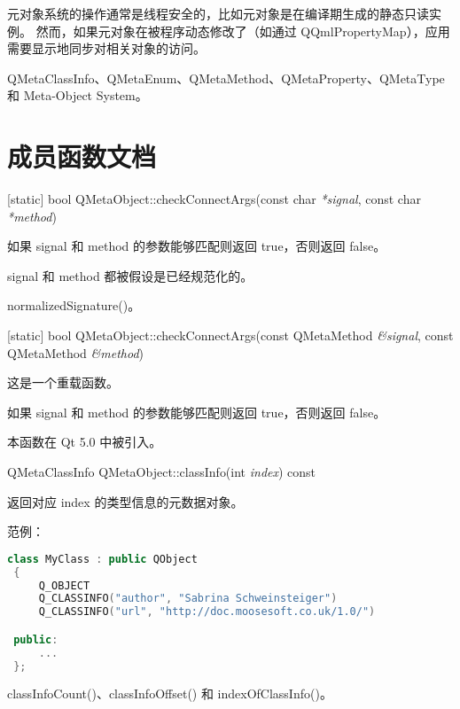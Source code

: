 \begin{notice}
元对象系统的操作通常是线程安全的，比如元对象是在编译期生成的静态只读实例。
然而，如果元对象在被程序动态修改了（如通过 QQmlPropertyMap），应用需要显示地同步对相关对象的访问。
\end{notice}

\begin{notice}[另请参阅]
QMetaClassInfo、QMetaEnum、QMetaMethod、QMetaProperty、QMetaType 和 Meta-Object System。
\end{notice}

\section{成员函数文档}

[static] bool QMetaObject::checkConnectArgs(const char \emph{*signal}, const char \emph{*method})

如果 signal 和 method 的参数能够匹配则返回 true，否则返回 false。

signal 和 method 都被假设是已经规范化的。

\begin{notice}[另请参阅]
normalizedSignature()。
\end{notice}

[static] bool QMetaObject::checkConnectArgs(const QMetaMethod \emph{\&signal}, const QMetaMethod \emph{\&method})

这是一个重载函数。

如果 signal 和 method 的参数能够匹配则返回 true，否则返回 false。

本函数在 Qt 5.0 中被引入。

QMetaClassInfo QMetaObject::classInfo(int \emph{index}) const

返回对应 index 的类型信息的元数据对象。

范例：

\begin{lstlisting}[language=C++]
class MyClass : public QObject
 {
     Q_OBJECT
     Q_CLASSINFO("author", "Sabrina Schweinsteiger")
     Q_CLASSINFO("url", "http://doc.moosesoft.co.uk/1.0/")

 public:
     ...
 };
\end{lstlisting}



\begin{notice}[另请参阅]
classInfoCount()、classInfoOffset() 和 indexOfClassInfo()。
\end{notice}

